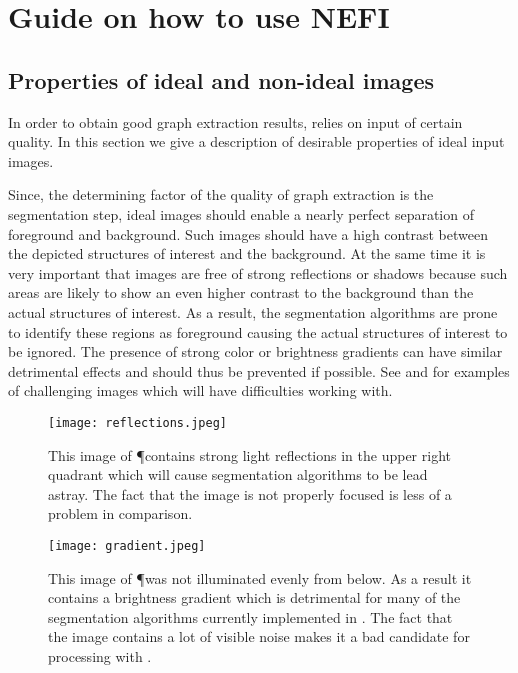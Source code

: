 
\chapter{Guide on how to use NEFI}

\section{Properties of ideal and non-ideal images}

	In order to obtain good graph extraction results, \NEFI relies on input of certain quality. In this section we give a description of desirable properties of ideal input images.

	Since, the determining factor of the quality of \NEFIs graph extraction is the segmentation step, ideal images should enable a nearly perfect separation of foreground and background. Such images should have a high contrast between the depicted structures of interest and the background. At the same time it is very important that images are free of strong reflections or shadows because such areas are likely to show an even higher contrast to the background than the actual structures of interest. As a result, the segmentation algorithms are prone to identify these regions as foreground causing the actual structures of interest to be ignored. The presence of strong color or brightness gradients can have similar detrimental effects and should thus be prevented if possible. See  and  for examples of challenging images which \NEFI will have difficulties working with.

	\begin{figure}
		\centering
		\texttt{[image: reflections.jpeg]}
		\caption[\NEFIs caveats: Reflections]{This image of \P contains strong light reflections in the upper right quadrant which will cause \NEFIs segmentation algorithms to be lead astray. The fact that the image is not properly focused is less of a problem in comparison.}
		\label{fig:sup:reflection}
	\end{figure}

	\begin{figure}
		\centering
		\texttt{[image: gradient.jpeg]}
		\caption[\NEFIs caveats: Gradients]{This image of \P was not illuminated evenly from below. As a result it contains a brightness gradient which is detrimental for many of the segmentation algorithms currently implemented in \NEFI. The fact that the image contains a lot of visible noise makes it a bad candidate for processing with \NEFI.}
		\label{fig:sup:gradient}
	\end{figure}

